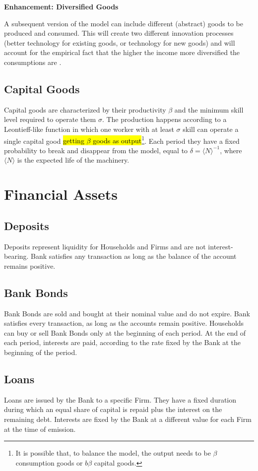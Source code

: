 \documentclass[a4paper, headings=standardclasses]{scrartcl}
\newenvironment{enh}[1][]{\begin{framed}\noindent\textbf{Enhancement: #1}\par}{\end{framed}}
\begin{document}
\begin{enh}[Diversified Goods]
	A subsequent version of the model can include different (abstract) goods to be produced and consumed. This will create two different innovation processes (better technology for existing goods, or technology for new goods) and will account for the empirical fact that the higher the income more diversified the consumptions are \parencite[cfr.][§2]{didomenico2022}.
\end{enh}

\subsection{Capital Goods}
Capital goods are characterized by their productivity $\beta$ and the minimum skill level required to operate them $\sigma$. The production happens according to a Leontieff-like function in which one worker with at least $\sigma$ skill can operate a single capital good \hl{ getting $\beta$ goods as output}\footnote{It is possible that, to balance the model, the output needs to be $\beta$ consumption goods or $b\beta$ capital goods.}. Each period they have a fixed probability to break and disappear from the model, equal to $\delta = \langle N \rangle^{-1}$, where $\langle N \rangle$ is the expected life of the machinery.

\section{Financial Assets}

\subsection{Deposits}
Deposits represent liquidity for Households and Firms and are not interest-bearing. Bank satisfies any transaction as long as the balance of the account remains positive.

\subsection{Bank Bonds}
Bank Bonds are sold and bought at their nominal value and do not expire. Bank satisfies every transaction, as long as the accounts remain positive. Households can buy or sell Bank Bonds only at the beginning of each period. At the end of each period, interests are paid, according to the rate fixed by the Bank at the beginning of the period.

\subsection{Loans}
Loans are issued by the Bank to a specific Firm. They have a fixed duration during which an equal share of capital is repaid plus the interest on the remaining debt. Interests are fixed by the Bank at a different value for each Firm at the time of emission.
\end{document}
